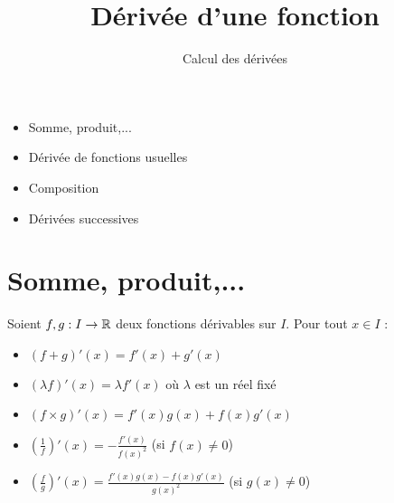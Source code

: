 









\title{{\bf Dérivée d'une fonction}}
\subtitle{Calcul des dérivées}

\begin{frame}
  
  \debutmontitre

  \pause

{\footnotesize
\hfill
{}
\begin{minipage}{0.6\textwidth}
  \begin{itemize}
    \item<3-> Somme, produit,...
    \item<4-> Dérivée de fonctions usuelles
    \item<5-> Composition
    \item<6-> Dérivées successives
  \end{itemize}
\end{minipage}
}

\end{frame}

\setcounter{framenumber}{0}




\section*{Somme, produit,...}


\begin{frame}

\begin{proposition}
Soient $f,g : I \to \mathbb{R}$ deux fonctions dérivables sur $I$. Pour tout $x \in I$ :
\pause
\begin{itemize}[<+->]
\setlength{\itemsep}{7pt} 
  \item $(f+g)'(x) = f'(x)+g'(x)$
  \item $(\lambda f)'(x) = \lambda f'(x)$ où $\lambda$ est un réel fixé
  \item $(f \times g)'(x) = f'(x)g(x)+f(x)g'(x)$
  \item $\left(\frac{1}{f}\right)'(x)=-\frac{f'(x)}{f(x)^2}$ (si $f(x) \neq 0$)
  \item $\left(\frac{f}{g}\right)'(x)=\frac{f'(x)g(x)-f(x)g'(x)}{g(x)^2}$ (si $g(x) \neq 0$)
\end{itemize}  
\end{proposition}

\end{frame}



